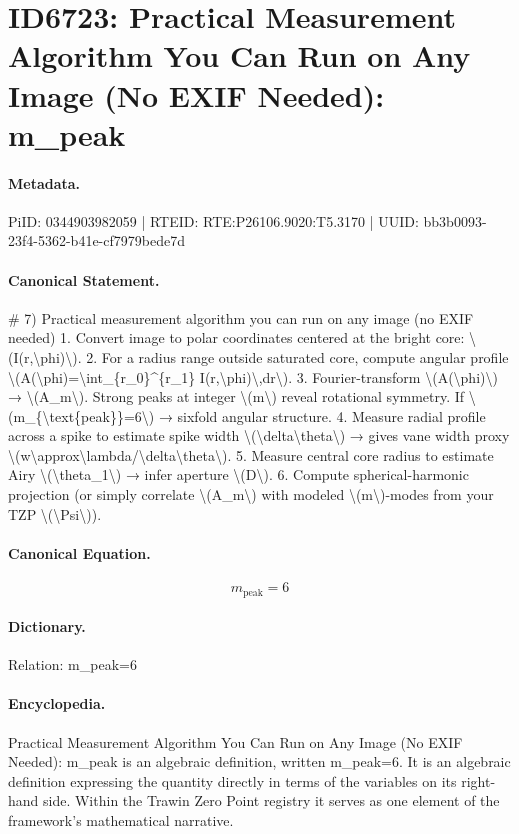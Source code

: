 \section*{ID6723: Practical Measurement Algorithm You Can Run on Any Image (No EXIF Needed): m\_peak}
\paragraph{Metadata.}
PiID: 0344903982059 | RTEID: RTE:P26106.9020:T5.3170 | UUID: bb3b0093-23f4-5362-b41e-cf7979bede7d

\paragraph{Canonical Statement.}
\# 7) Practical measurement algorithm you can run on any image (no EXIF needed) 1. Convert image to polar coordinates centered at the bright core: \textbackslash{}(I(r,\textbackslash{}phi)\textbackslash{}). 2. For a radius range outside saturated core, compute angular profile \textbackslash{}(A(\textbackslash{}phi)=\textbackslash{}int\_\{r\_0\}\textasciicircum{}\{r\_1\} I(r,\textbackslash{}phi)\textbackslash{},dr\textbackslash{}). 3. Fourier-transform \textbackslash{}(A(\textbackslash{}phi)\textbackslash{}) → \textbackslash{}(A\_m\textbackslash{}). Strong peaks at integer \textbackslash{}(m\textbackslash{}) reveal rotational symmetry. If \textbackslash{}(m\_\{\textbackslash{}text\{peak\}\}=6\textbackslash{}) → sixfold angular structure. 4. Measure radial profile across a spike to estimate spike width \textbackslash{}(\textbackslash{}delta\textbackslash{}theta\textbackslash{}) → gives vane width proxy \textbackslash{}(w\textbackslash{}approx\textbackslash{}lambda/\textbackslash{}delta\textbackslash{}theta\textbackslash{}). 5. Measure central core radius to estimate Airy \textbackslash{}(\textbackslash{}theta\_1\textbackslash{}) → infer aperture \textbackslash{}(D\textbackslash{}). 6. Compute spherical-harmonic projection (or simply correlate \textbackslash{}(A\_m\textbackslash{}) with modeled \textbackslash{}(m\textbackslash{})-modes from your TZP \textbackslash{}(\textbackslash{}Psi\textbackslash{})).

\paragraph{Canonical Equation.}
\[
m_{\text{peak}}=6
\]

\paragraph{Dictionary.}
Relation: m\_peak=6

\paragraph{Encyclopedia.}
Practical Measurement Algorithm You Can Run on Any Image (No EXIF Needed): m\_peak is an algebraic definition, written m\_peak=6. It is an algebraic definition expressing the quantity directly in terms of the variables on its right-hand side. Within the Trawin Zero Point registry it serves as one element of the framework's mathematical narrative.

